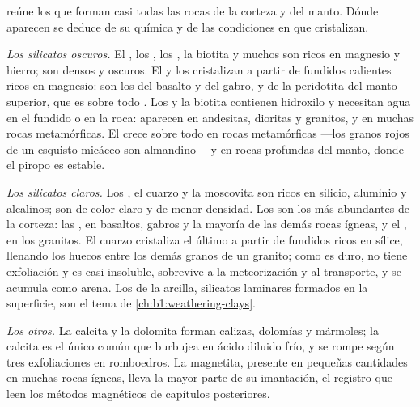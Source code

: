  reúne los  que forman casi todas las rocas de la corteza y
del manto. Dónde aparecen se deduce de su química y de las condiciones en que cristalizan.

\emph{Los silicatos oscuros.} El , los , los , la biotita y muchos  son ricos en
magnesio y hierro; son densos y oscuros. El  y los  cristalizan a partir de fundidos calientes ricos
en magnesio: son los  del basalto y del gabro, y de la peridotita del manto superior, que es sobre todo
. Los  y la biotita contienen hidroxilo y necesitan agua en el fundido o en la roca: aparecen en
andesitas, dioritas y granitos, y en muchas rocas metamórficas. El  crece sobre todo en rocas metamórficas
---los granos rojos de un esquisto micáceo son almandino--- y en rocas profundas del manto, donde el piropo es estable.

\emph{Los silicatos claros.} Los , el cuarzo y la moscovita son ricos en silicio, aluminio y
alcalinos; son de color claro y de menor densidad. Los  son los  más abundantes de la
corteza: las , en basaltos, gabros y la mayoría de las demás rocas ígneas, y el , en los granitos. El cuarzo cristaliza el último a partir de fundidos ricos en sílice, llenando los
huecos entre los demás granos de un granito; como es duro, no tiene exfoliación y es casi insoluble, sobrevive
a la meteorización y al transporte, y se acumula como arena. Los  de la arcilla, silicatos laminares
formados en la superficie, son el tema de \cref{ch:b1:weathering-clays}.

\emph{Los otros.} La calcita y la dolomita forman calizas, dolomías y mármoles; la calcita es el único 
común que burbujea en ácido diluido frío, y se rompe según tres exfoliaciones en romboedros. La magnetita,
presente en pequeñas cantidades en muchas rocas ígneas, lleva la mayor parte de su imantación, el registro que
leen los métodos magnéticos de capítulos posteriores.


